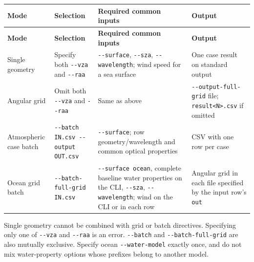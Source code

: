 {\TableFont
\begin{longtable}{@{}>{\raggedright\arraybackslash}p{}>{\raggedright\arraybackslash}p{}>{\raggedright\arraybackslash}p{}>{\raggedright\arraybackslash}p{}@{}}
\toprule
\textbf{Mode} & \textbf{Selection} & \textbf{Required common inputs} & \textbf{Output} \\
\midrule
\endfirsthead
\toprule
\textbf{Mode} & \textbf{Selection} & \textbf{Required common inputs} & \textbf{Output} \\
\midrule
\endhead
\bottomrule
\endfoot
Single geometry & Specify both \texttt{-\allowbreak{}-\allowbreak{}vza} and \texttt{-\allowbreak{}-\allowbreak{}raa} & \texttt{-\allowbreak{}-\allowbreak{}surface}, \texttt{-\allowbreak{}-\allowbreak{}sza}, \texttt{-\allowbreak{}-\allowbreak{}wavelength}; wind speed for a sea surface & One case result on standard output \\
Angular grid & Omit both \texttt{-\allowbreak{}-\allowbreak{}vza} and \texttt{-\allowbreak{}-\allowbreak{}raa} & Same as above & \texttt{-\allowbreak{}-\allowbreak{}output-\allowbreak{}full-\allowbreak{}grid} file; \texttt{result<N>.\allowbreak{}csv} if omitted \\
Atmospheric case batch & \texttt{-\allowbreak{}-\allowbreak{}batch IN.\allowbreak{}csv -\allowbreak{}-\allowbreak{}output OUT.\allowbreak{}csv} & \texttt{-\allowbreak{}-\allowbreak{}surface}; row geometry/wavelength and common optical properties & CSV with one row per case \\
Ocean grid batch & \texttt{-\allowbreak{}-\allowbreak{}batch-\allowbreak{}full-\allowbreak{}grid IN.\allowbreak{}csv} & \texttt{-\allowbreak{}-\allowbreak{}surface ocean}, complete baseline water properties on the CLI, \texttt{-\allowbreak{}-\allowbreak{}sza}, \texttt{-\allowbreak{}-\allowbreak{}wavelength}; wind on the CLI or in each row & Angular grid in each file specified by the input row's \texttt{out} \\
\end{longtable}
}

Single geometry cannot be combined with grid or batch directives. Specifying only one of \texttt{-\allowbreak{}-\allowbreak{}vza} and \texttt{-\allowbreak{}-\allowbreak{}raa} is an error. \texttt{-\allowbreak{}-\allowbreak{}batch} and \texttt{-\allowbreak{}-\allowbreak{}batch-\allowbreak{}full-\allowbreak{}grid} are also mutually exclusive. Specify ocean \texttt{-\allowbreak{}-\allowbreak{}water-\allowbreak{}model} exactly once, and do not mix water-property options whose prefixes belong to another model.

